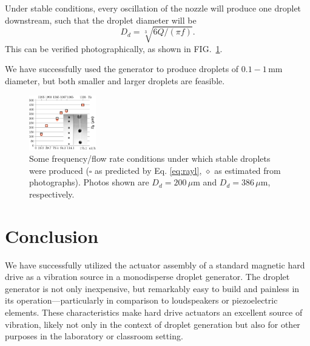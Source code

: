 \documentclass[aip,rsi,reprint,graphicx]{revtex4-1} %
\begin{document}
Under stable conditions, every oscillation of the nozzle will produce one droplet
downstream,\cite{Rayleigh79} such that the droplet diameter will be 
\begin{equation}
        D_d = \sqrt[3]{6Q/(\pi f)}.\label{eq:rayl}
\end{equation}
This can be verified photographically, as shown in FIG.~\ref{fig:dropphoto}.

We have successfully used the generator to produce droplets of
$0.1-1\,$mm diameter, but both smaller and larger droplets are feasible.

\begin{figure}[h!]
\centering
\includegraphics[width=0.26\textwidth]{hdg_images/sizes.eps}
\caption{Some frequency/flow rate conditions under which stable droplets were
        produced ($\square$ as predicted by Eq. \ref{eq:rayl},
        {\Large$\diamond$} as estimated
        from photographs). Photos shown are $D_d = 200\,\mu$m and $D_d = 386\,\mu$m,
        respectively.
       \label{fig:dropphoto}}
\end{figure}
\section{Conclusion}
We have successfully utilized the actuator assembly of a standard magnetic hard
drive as a vibration source in a monodisperse droplet generator. The droplet
generator is not only inexpensive, but remarkably easy to build and painless in
its operation---particularly in comparison to loudspeakers or piezoelectric elements.
These characteristics make hard drive actuators an excellent source of
vibration, likely not only in the context of droplet generation but also for other
purposes in the laboratory or classroom setting.

\end{document}
